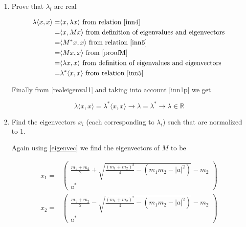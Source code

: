 \documentclass[11pt,letterpaper]{article}%
\newcommand\abs[1]{\left|#1\right|}
\newcommand\inn[2]{\langle#1,#2\rangle}
\begin{document}
\begin{enumerate}[label=\Large{\textbf{\arabic*.}}]
{\begin{enumerate}[label=\textit{\roman*.}]
{Now using \eqref{eigenval} we find the eigenvalues for $M$ to be
\renewcommand\theequation{\arabic{equation}}
\setcounter{equation}{4}

\begin{equation}
\label{eigenvalues}
\begin{split}
\lambda_1 =& \frac{m_1 + m_2}{2} + \sqrt{\frac{(m_1 + m_2)^2}{4} - \left( m_1m_2 - \abs{a}^2 \right)}\\
\lambda_2 =& \frac{m_1 + m_2}{2} - \sqrt{\frac{(m_1 + m_2)^2}{4} - \left( m_1m_2 - \abs{a}^2 \right)}
\end{split}
\end{equation}
}

\item{
Prove that $\lambda_i$ are real

\begin{equation}
\label{realeigenval1}
\begin{split}
\lambda\inn{x}{x} =& \inn{x}{\lambda x}\text{ from relation \eqref{inn4}}\\
=& \inn{x}{Mx}\text{ from definition of eigenvalues and eigenvectors}\\
=& \inn{M^*x}{x}\text{ from relation \eqref{inn6}}\\
=& \inn{Mx}{x}\text{ from \eqref{proofM}}\\
=& \inn{\lambda x}{x}\text{ from definition of eigenvalues and eigenvectors}\\
=& \lambda^*\inn{x}{x}\text{ from relation \eqref{inn5}}
\end{split}
\end{equation}

Finally from \eqref{realeigenval1} and taking into account \eqref{inn1p} we get

\begin{equation}
\label{realeigenval2}
\lambda\inn{x}{x} = \lambda^*\inn{x}{x} \to \lambda = \lambda^* \to \lambda \in \mathbb{R}
\end{equation}
}

\item{
Find the eigenvectors $x_i$ (each corresponding to $\lambda_i$) such that are normalized to 1.

Again using \eqref{eigenvec} we find the eigenvectors of $M$ to be

\begin{equation}
\label{eigenvectors}
\begin{split}
x_1 =& 
\begin{pmatrix}
\frac{m_1 + m_2}{2} + \sqrt{\frac{(m_1 + m_2)^2}{4} - \left( m_1m_2 - \abs{a}^2 \right)} - m_2\\
a^*
\end{pmatrix}\\
x_2 =&
\begin{pmatrix}
\frac{m_1 + m_2}{2} - \sqrt{\frac{(m_1 + m_2)^2}{4} - \left( m_1m_2 - \abs{a}^2 \right)} - m_2\\
a^*
\end{pmatrix}
\end{split}
\end{equation}

}
\end{enumerate}}
\end{enumerate}
\end{document}
